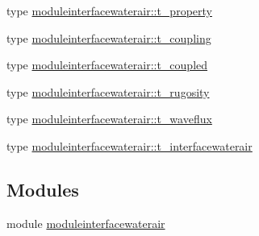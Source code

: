 \begin{DoxyCompactItemize}
type \mbox{\hyperlink{structmoduleinterfacewaterair_1_1t__property}{moduleinterfacewaterair\+::t\+\_\+property}}
\item 
type \mbox{\hyperlink{structmoduleinterfacewaterair_1_1t__coupling}{moduleinterfacewaterair\+::t\+\_\+coupling}}
\item 
type \mbox{\hyperlink{structmoduleinterfacewaterair_1_1t__coupled}{moduleinterfacewaterair\+::t\+\_\+coupled}}
\item 
type \mbox{\hyperlink{structmoduleinterfacewaterair_1_1t__rugosity}{moduleinterfacewaterair\+::t\+\_\+rugosity}}
\item 
type \mbox{\hyperlink{structmoduleinterfacewaterair_1_1t__waveflux}{moduleinterfacewaterair\+::t\+\_\+waveflux}}
\item 
type \mbox{\hyperlink{structmoduleinterfacewaterair_1_1t__interfacewaterair}{moduleinterfacewaterair\+::t\+\_\+interfacewaterair}}
\end{DoxyCompactItemize}
\subsection*{Modules}
\begin{DoxyCompactItemize}
\item 
module \mbox{\hyperlink{namespacemoduleinterfacewaterair}{moduleinterfacewaterair}}
\end{DoxyCompactItemize}
